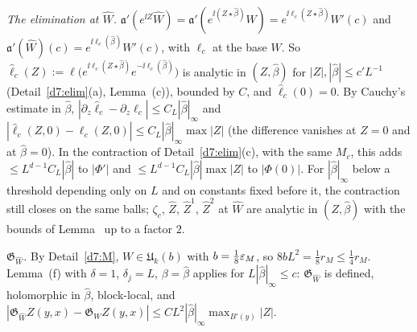 \begin{detail}\label{d7:covc}
\begin{step}
\emph{The elimination at $\hat W$.} $\mathfrak a'(e^{\ii Z}\hat W)=\mathfrak a'(e^{\ii(Z\star\hat\beta)}W)=e^{\ii\ell_c(Z\star\hat\beta)}W'(c)$ and $\mathfrak a'(\hat W)(c)=e^{\ii\ell_c(\hat\beta)}W'(c)$, with $\ell_c$ at the base $W$. So $\hat\ell_c(Z):=\ell\big(e^{\ii\ell_c(Z\star\hat\beta)}e^{-\ii\ell_c(\hat\beta)}\big)$ is analytic in $(Z,\hat\beta)$ for $|Z|,|\hat\beta|\le c'L^{-1}$ (Detail~\ref{d7:elim}(a), Lemma~(c)), bounded by $C$, and $\hat\ell_c(0)=0$. By Cauchy's estimate in $\hat\beta$, $|\partial_z\hat\ell_c-\partial_z\ell_c|\le C_L|\hat\beta|_\infty$ and $|\hat\ell_c(Z,0)-\ell_c(Z,0)|\le C_L|\hat\beta|_\infty\max|Z|$ (the difference vanishes at $Z=0$ and at $\hat\beta=0$). In the contraction of Detail~\ref{d7:elim}(c), with the same $M_c$, this adds $\le L^{d-1}C_L|\hat\beta|$ to $|\Phi'|$ and $\le L^{d-1}C_L|\hat\beta|\max|Z|$ to $|\Phi(0)|$. For $|\hat\beta|_\infty$ below a threshold depending only on $L$ and on constants fixed before it, the contraction still closes on the same balls; $\zeta_c$, $\hat Z$, $\hat Z^1$, $\hat Z^2$ at $\hat W$ are analytic in $(Z,\hat\beta)$ with the bounds of Lemma~ up to a factor $2$.
\end{step}
\begin{step}
\emph{$\mathfrak G_{\hat W}$.} By Detail~\ref{d7:M}, $W\in\mathfrak U_k(b)$ with $b=\frac18\varepsilon_M$, so $8bL^2=\frac18r_M\le\frac14r_M$. Lemma~(f) with $\delta=1$, $\delta_j=L$, $\beta=\hat\beta$ applies for $L|\hat\beta|_\infty\le c$: $\mathfrak G_{\hat W}$ is defined, holomorphic in $\hat\beta$, block-local, and $|\mathfrak G_{\hat W}Z(y,x)-\mathfrak G_WZ(y,x)|\le CL^2|\hat\beta|_\infty\max_{B'(y)}|Z|$.
\end{step}
\begin{step}

\end{step}
\end{detail}
